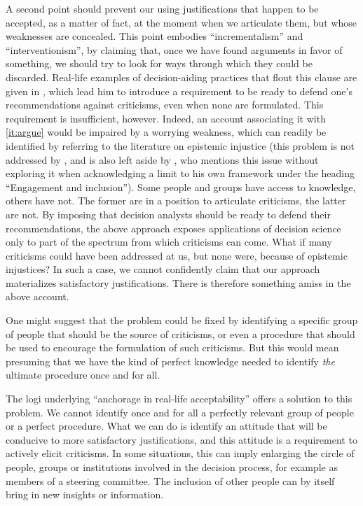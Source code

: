 \documentclass[preprint, french, english, 11pt, authoryear]{elsarticle}%
\begin{document}
A second point should prevent our using justifications that happen to be accepted, as a matter of fact, at the moment when we articulate them, but whose weaknesses are concealed. 
This point embodies “incrementalism” and ``interventionism'', by claiming that, once we have found arguments in favor of something, we should try to look for ways through which they could be discarded. 
Real-life examples of decision-aiding practices that flout this clause are given in \cite{meinard_what_2017}, which lead him to introduce a requirement to be ready to defend one's recommendations against criticisms, even when none are formulated. 
This requirement is insufficient, however. Indeed, an account associating it with \cref{it:argue} would be impaired by a worrying weakness, which can readily be identified by referring to the literature on epistemic injustice \citep{fricker_epistemic_2007} 
(this problem is not addressed by \cite{meinard_what_2017}, and is also left aside by \cite{mingers_ethics_2011}, who mentions this issue without exploring it when acknowledging a limit to his own framework under the heading ``Engagement and inclusion''). 
Some people and groups have access to knowledge, others have not. The former are in a position to articulate criticisms, the latter are not. 
By imposing that decision analysts should be ready to defend their recommendations, the above approach exposes applications of decision science only to part of the spectrum from which criticisms can come. 
What if many criticisms could have been addressed at us, but none were, because of epistemic injustices? In such a case, we cannot confidently claim that our approach materializes satisfactory justifications. There is therefore something amiss in the above account.

One might suggest that the problem could be fixed by identifying a specific group of people that should be the source of criticisms, or even a procedure that should be used to encourage the formulation of such criticisms. 
But this would mean presuming that we have the kind of perfect knowledge needed to identify \emph{the} ultimate procedure once and for all.

The logi underlying ``anchorage in real-life acceptability” offers a solution to this problem. We cannot identify once and for all a perfectly relevant group of people or a perfect procedure. 
What we can do is identify an attitude that will be conducive to more satisfactory justifications, and this attitude is a requirement to actively elicit criticisms.
In some situations, this can imply enlarging the circle of people, groups or institutions involved in the decision process, for example as members of a steering committee.
The inclusion of other people can by itself bring in new insights or information.
  
\end{document}
